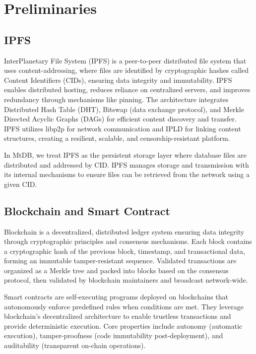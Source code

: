 \documentclass[conference]{IEEEtran}
\newcommand{\wenyi}[1]{ {\color{blue}{#1}}}
\newcommand{\ours}{\xspace MtDB\xspace}
\begin{document}

\section{Preliminaries}
\subsection{IPFS}
InterPlanetary File System (IPFS) is a peer-to-peer distributed file system that uses content-addressing, where files are identified by cryptographic hashes called Content Identifiers (CIDs), ensuring data integrity and immutability. IPFS enables distributed hosting, reduces reliance on centralized servers, and improves redundancy through mechanisms like pinning. The architecture integrates Distributed Hash Table (DHT), Bitswap (data exchange protocol), and Merkle Directed Acyclic Graphs (DAGs) for efficient content discovery and transfer. IPFS utilizes libp2p for network communication and IPLD for linking content structures, creating a resilient, scalable, and censorship-resistant platform.

In \ours, we treat IPFS as the persistent storage layer where database files are distributed and addressed by CID. IPFS manages storage and transmission with its internal mechanisms to ensure files can be retrieved from the network using a given CID.

\subsection{Blockchain and Smart Contract}
Blockchain is a decentralized, distributed ledger system ensuring data integrity through cryptographic principles and consensus mechanisms. Each block contains a cryptographic hash of the previous block, timestamp, and transactional data, forming an immutable tamper-resistant sequence. Validated transactions are organized as a Merkle tree and packed into blocks based on the consensus protocol, then validated by blockchain maintainers and broadcast network-wide.

Smart contracts are self-executing programs deployed on blockchains that autonomously enforce predefined rules when conditions are met. They leverage blockchain's decentralized architecture to enable trustless transactions and provide deterministic execution. Core properties include autonomy (automatic execution), tamper-proofness (code immutability post-deployment), and auditability (transparent on-chain operations).
\end{document}
